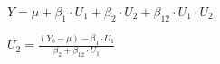 \documentclass[12pt]{article}
\begin{document}
\pagestyle{empty}
\Large
{}
\pagecolor{ehandbook}

\boldmath

$Y = \mu + \beta_1 \cdot U_1 + \beta_2 \cdot U_2 + \beta_{12} \cdot U_1 \cdot U_2 $

\vspace*{1in}

$\displaystyle{U_2 = \frac{(Y_0 - \mu) - \beta_1 \cdot U_1}{\beta_2 + \beta_{12} \cdot U_1}}$

 
\end{document}
